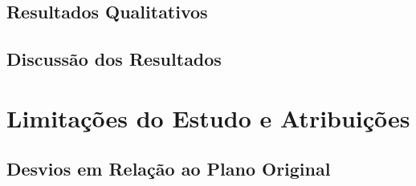 \documentclass[12pt,a4paper]{article}
\begin{document}

\subsection{Resultados Qualitativos}









\subsection{Discussão dos Resultados}

\section{Limitações do Estudo e Atribuições}

\subsection{Desvios em Relação ao Plano Original}
\end{document}
